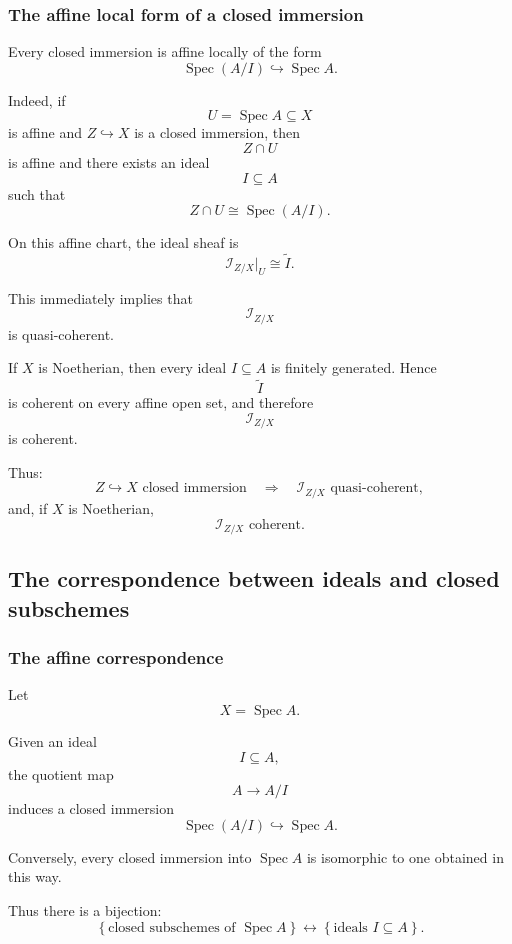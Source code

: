 \subsubsection{The affine local form of a closed immersion}

Every closed immersion is affine locally of the form
\[
\operatorname{Spec}(A/I)\hookrightarrow\operatorname{Spec} A.
\]

Indeed, if
\[
U=\operatorname{Spec} A\subseteq X
\]
is affine and \(Z\hookrightarrow X\) is a closed immersion, then
\[
Z\cap U
\]
is affine and there exists an ideal
\[
I\subseteq A
\]
such that
\[
Z\cap U\cong\operatorname{Spec}(A/I).
\]

On this affine chart, the ideal sheaf is
\[
\mathcal{I}_{Z/X}|_U\cong\widetilde I.
\]

This immediately implies that
\[
\mathcal{I}_{Z/X}
\]
is quasi-coherent.

If \(X\) is Noetherian, then every ideal \(I\subseteq A\) is finitely generated. Hence
\[
\widetilde I
\]
is coherent on every affine open set, and therefore
\[
\mathcal{I}_{Z/X}
\]
is coherent.

Thus:
\[
\boxed{
	Z\hookrightarrow X\text{ closed immersion}
	\quad\Longrightarrow\quad
	\mathcal{I}_{Z/X}\text{ quasi-coherent},
}
\]
and, if \(X\) is Noetherian,
\[
\boxed{
	\mathcal{I}_{Z/X}\text{ coherent}.
}
\]

\subsection{The correspondence between ideals and closed subschemes}

\subsubsection{The affine correspondence}

Let
\[
X=\operatorname{Spec} A.
\]

Given an ideal
\[
I\subseteq A,
\]
the quotient map
\[
A\longrightarrow A/I
\]
induces a closed immersion
\[
\operatorname{Spec}(A/I)\hookrightarrow\operatorname{Spec} A.
\]

Conversely, every closed immersion into \(\operatorname{Spec} A\) is isomorphic to one obtained in this way.

Thus there is a bijection:
\[
\boxed{
	\left\{
	\text{closed subschemes of }\operatorname{Spec} A
	\right\}
	\longleftrightarrow
	\left\{
	\text{ideals }I\subseteq A
	\right\}.
}
\]

